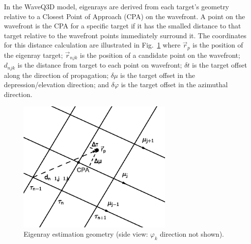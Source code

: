 \documentclass{ws-jca}
\begin{document}
In the WaveQ3D model, eigenrays are derived from each target's geometry relative
to a Closest Point of Approach (CPA) on the wavefront. A point on the
wavefront is the CPA for a specific target if it has the smalled distance to that target
relative to the wavefront points immediately surround it. The coordinates for this distance calculation are illustrated
in Fig.~\ref{fig:eigenray_geometry}
where
\(\vec{r}_{p}\) is the position of the eigenray target;
\(\vec{r}_{njk}\) is the position of a candidate point on the wavefront;
\(d_{njk}\) is the distance from target to each point on wavefront;
\(\delta t\) is the target offset along the direction of propagation;
\(\delta\mu\) is the target offset in the depression/elevation direction; and 
\(\delta\varphi\) is the target offset in the azimuthal direction.
\begin{figure}[th]
	\centerline{\includegraphics[width=3in]{EigenrayGeometry.eps}} 
	\vspace*{8pt}
	\caption{Eigenray estimation geometry 
		(side view: \(\varphi_k\) direction not shown).}
	\label{fig:eigenray_geometry}
\end{figure}
\end{document}
